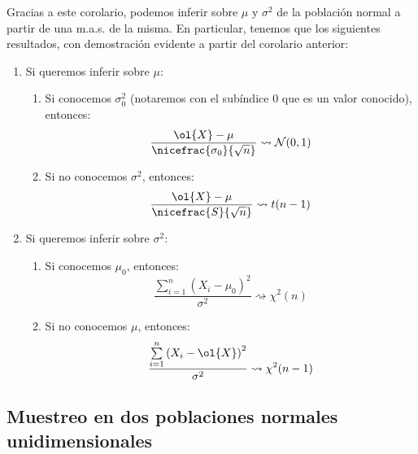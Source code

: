 Gracias a este corolario, podemos inferir sobre $\mu$ y $\sigma^2$ de la población normal a partir de una m.a.s. de la misma. En particular, tenemos que los siguientes resultados, con demostración evidente a partir del corolario anterior:
\begin{enumerate}
    \item Si queremos inferir sobre $\mu$:
    \begin{enumerate}
        \item Si conocemos $\sigma^2_0$ (notaremos con el subíndice $0$ que es un valor conocido), entonces:
        \begin{equation*}
            \dfrac{\ol{X}-\mu}{\nicefrac{\sigma_0}{\sqrt{n}}} \rightsquigarrow \cc{N}(0,1)
        \end{equation*}

        \item Si no conocemos $\sigma^2$, entonces:
        \begin{equation*}
            \dfrac{\ol{X}-\mu}{\nicefrac{S}{\sqrt{n}}} \rightsquigarrow t(n-1)
        \end{equation*}
    \end{enumerate}

    \item Si queremos inferir sobre $\sigma^2$:
    \begin{enumerate}
        \item Si conocemos $\mu_0$, entonces:
        \begin{equation*}
            \dfrac{\sum\limits_{i=1}^n {(X_i - \mu_0)}^{2}}{\sigma^2} \rightsquigarrow \chi^2(n)
        \end{equation*}
        \item Si no conocemos $\mu$, entonces:
        \begin{equation*}
            \dfrac{\sum\limits_{i=1}^n {(X_i - \ol{X})}^{2}}{\sigma^2} \rightsquigarrow \chi^2(n-1)
        \end{equation*}
    \end{enumerate}
\end{enumerate}

\subsection{Muestreo en dos poblaciones normales unidimensionales}

